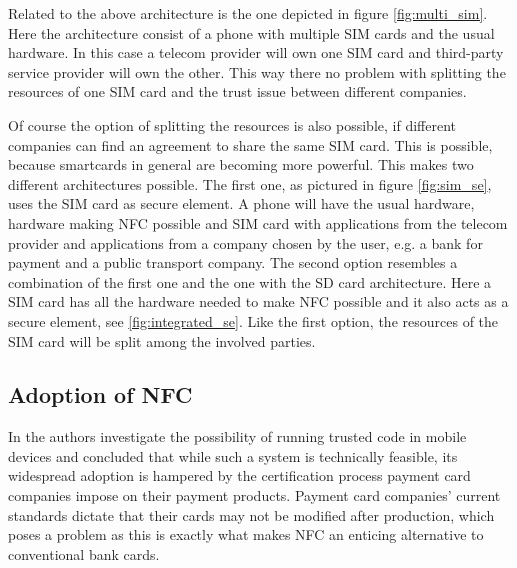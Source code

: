 Related to the above architecture is the one depicted in figure \ref{fig:multi_sim}.
Here the architecture consist of a phone with multiple SIM cards and the usual hardware.
In this case a telecom provider will own one SIM card and third-party service provider will own the other.
This way there no problem with splitting the resources of one SIM card and the trust issue between different companies.

Of course the option of splitting the resources is also possible, if different companies can find an agreement to share the same SIM card.
This is possible, because smartcards in general are becoming more powerful.
This makes two different architectures possible.
The first one, as pictured in figure \ref{fig:sim_se}, uses the SIM card as secure element.
A phone will have the usual hardware, hardware making NFC possible and SIM card with applications from the telecom provider and applications from a company chosen by the user, e.g. a bank for payment and a public transport company. 
The second option resembles a combination of the first one and the one with the SD card architecture.
Here a SIM card has all the hardware needed to make NFC possible and it also acts as a secure element, see \ref{fig:integrated_se}.
Like the first option, the resources of the SIM card will be split among the involved parties.



\subsection{Adoption of NFC}
In \cite{1497411} the authors investigate the possibility of running trusted code in mobile devices and concluded that while such a system is technically feasible, its widespread adoption is hampered by the certification process payment card companies impose on their payment products.
Payment card companies' current standards dictate that their cards may not be modified after production, which poses a problem as this is exactly what makes NFC an enticing alternative to conventional bank cards.

